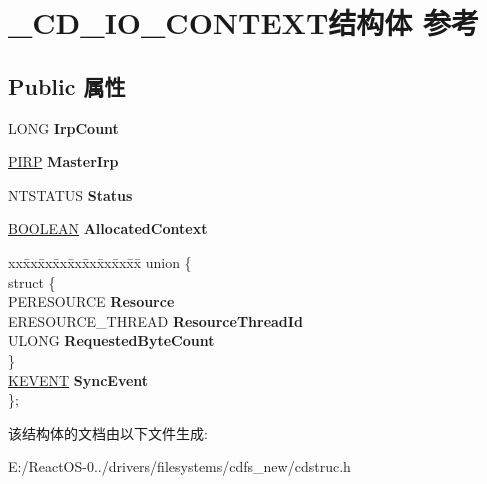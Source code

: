 \hypertarget{struct___c_d___i_o___c_o_n_t_e_x_t}{}\section{\+\_\+\+C\+D\+\_\+\+I\+O\+\_\+\+C\+O\+N\+T\+E\+X\+T结构体 参考}
\label{struct___c_d___i_o___c_o_n_t_e_x_t}
\subsection*{Public 属性}
\begin{DoxyCompactItemize}
\item 
\mbox{\label{struct___c_d___i_o___c_o_n_t_e_x_t_a3a1667fa822c602bc36b7ce7fe958544}} 
L\+O\+NG {\bfseries Irp\+Count}
\item 
\mbox{\label{struct___c_d___i_o___c_o_n_t_e_x_t_ae09b19a341ee9ba8508034389cd7fc34}} 
\hyperlink{interfacevoid}{P\+I\+RP} {\bfseries Master\+Irp}
\item 
\mbox{\label{struct___c_d___i_o___c_o_n_t_e_x_t_ac4d67daa1a624f41d66ef45702903533}} 
N\+T\+S\+T\+A\+T\+US {\bfseries Status}
\item 
\mbox{\label{struct___c_d___i_o___c_o_n_t_e_x_t_ac5b72d7fa3d6b66f733d482114f78bee}} 
\hyperlink{_processor_bind_8h_a112e3146cb38b6ee95e64d85842e380a}{B\+O\+O\+L\+E\+AN} {\bfseries Allocated\+Context}
\item 
\mbox{\label{struct___c_d___i_o___c_o_n_t_e_x_t_aaa0c7a77d01ac2ed419ec7ee58022d91}} 
\begin{tabbing}
xx\=xx\=xx\=xx\=xx\=xx\=xx\=xx\=xx\=\kill
union \{\\
\mbox{\label{union___c_d___i_o___c_o_n_t_e_x_t_1_1_0D592_acc79067f7431db8b5416eccf45d2e6ef}} 
\>struct \{\\
\>\>PERESOURCE {\bfseries Resource}\\
\>\>ERESOURCE\_THREAD {\bfseries ResourceThreadId}\\
\>\>ULONG {\bfseries RequestedByteCount}\\
\>\} \\
\>\hyperlink{struct___k_e_v_e_n_t}{KEVENT} {\bfseries SyncEvent}\\
\}; \\

\end{tabbing}\end{DoxyCompactItemize}


该结构体的文档由以下文件生成\+:\begin{DoxyCompactItemize}
\item 
E\+:/\+React\+O\+S-\/0../drivers/filesystems/cdfs\+\_\+new/cdstruc.\+h\end{DoxyCompactItemize}
